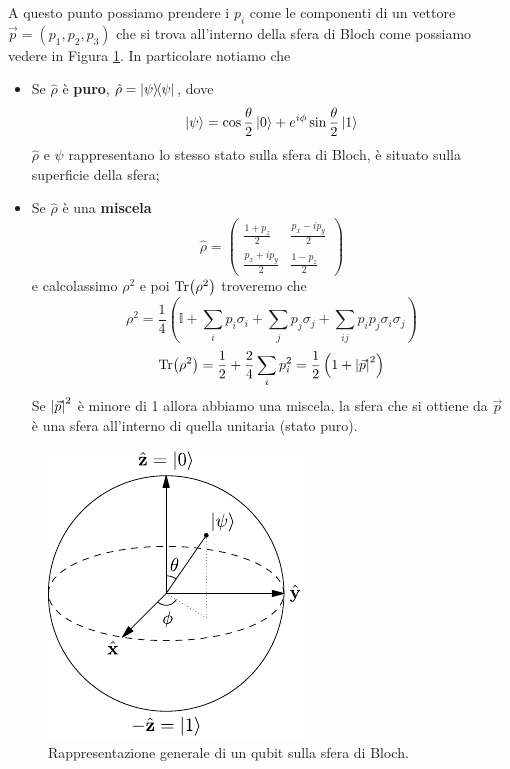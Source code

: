 A questo punto possiamo prendere i $p_i$ come le componenti di un vettore $\vec{p}=(p_1, p_2, p_3)$ che si trova all'interno della sfera di Bloch come possiamo vedere in Figura \ref{fig:BlochSphere}.
In particolare notiamo che
\begin{itemize}
    \item Se $\hat \rho$ è \textbf{puro}, $\hat \rho=\op{\psi}{\psi}$, dove
    \begin{equation*}
        \ket \psi = \cos \frac \theta 2 \ket 0 + e^{i\phi}\sin \frac \theta 2 \ket 1
    \end{equation*}
    $\hat \rho$ e $\psi$ rappresentano lo stesso stato sulla sfera di Bloch, è situato sulla superficie della sfera;
    \item Se $\hat \rho$ è una \textbf{miscela}
    \begin{equation*}
        \hat \rho = \begin{pmatrix}
                        \frac{1+p_z}{2} & \frac{p_x-ip_y}{2} \\
                        \frac{p_x+ip_y}{2} & \frac{1-p_z}{2}
                    \end{pmatrix}
    \end{equation*}
    e calcolassimo $\rho^2$ e poi $\Tr(\rho^2)$ troveremo che
    \begin{equation*}
        \rho^2 = \frac 14 \left(\mathbb{I}+\sum_ip_i \sigma_i + \sum_j p_j \sigma_j + \sum_{ij}p_ip_j\sigma_i\sigma_j\right)
    \end{equation*}
    \begin{equation*}
        \Tr(\rho^2) = \frac 12 + \frac 24 \sum_i p_i^2=\frac 12 \left(1+ \abs{\vec p}^2\right)
    \end{equation*}
    Se $\abs{\vec p}^2$ è minore di 1 allora abbiamo una miscela, la sfera che si ottiene da $\vec p$ è una sfera all'interno di quella unitaria (stato puro).
\end{itemize}
\begin{figure}[!ht]
    \centering
    \includegraphics[scale=1.4]{images/Bloch_Sphere.pdf}
    \caption{Rappresentazione generale di un qubit sulla sfera di Bloch.}
    \label{fig:BlochSphere}
\end{figure}
